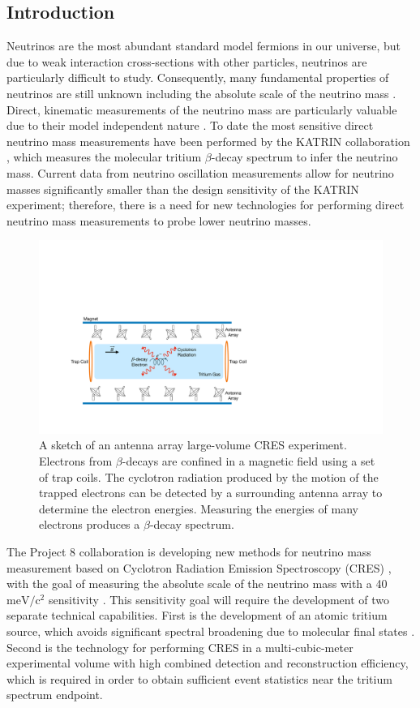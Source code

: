 \subsection{Introduction}
\label{sec:intro}

Neutrinos are the most abundant standard model fermions in our universe, but due to weak interaction cross-sections with other particles, neutrinos are particularly difficult to study. Consequently, many fundamental properties of neutrinos are still unknown including the absolute scale of the neutrino mass \cite{Workman:2022ynf}. Direct, kinematic measurements of the neutrino mass are particularly valuable due to their model independent nature \cite{FORMAGGIO20211}. To date the most sensitive direct neutrino mass measurements have been performed by the KATRIN collaboration \cite{Aker2022}, which measures the molecular tritium $\beta$-decay spectrum to infer the neutrino mass. Current data from neutrino oscillation measurements \cite{Workman:2022ynf} allow for neutrino masses significantly smaller than the design sensitivity of the KATRIN experiment; therefore, there is a need for new technologies for performing direct neutrino mass measurements to probe lower neutrino masses.

\begin{figure}[htbp]
\centering
\includegraphics[width=.6\textwidth]{figs/Chapter-5/220914_fscd_cartoon.pdf}
\qquad
\caption{\label{fig:fscd-cartoon} A sketch of an antenna array large-volume CRES experiment. Electrons from $\beta$-decays are confined in a magnetic field using a set of trap coils. The cyclotron radiation produced by the motion of the trapped electrons can be detected by a surrounding antenna array to determine the electron energies. Measuring the energies of many electrons produces a $\beta$-decay spectrum.}
\end{figure}

The Project 8 collaboration is developing new methods for neutrino mass measurement based on Cyclotron Radiation Emission Spectroscopy (CRES) \cite{Monreal:2009za, Project8:2014ivu, Project8:2017nal, Project8:2022wqh}, with the goal of measuring the absolute scale of the neutrino mass with a 40 $\textrm{meV}/\textrm{c}^2$ sensitivity \cite{PhysRevC.103.065501, FORMAGGIO20211}. This sensitivity goal will require the development of two separate technical capabilities. First is the development of an atomic tritium source, which avoids significant spectral broadening due to molecular final states \cite{Bodine:2015sma}. Second is the technology for performing CRES in a multi-cubic-meter experimental volume with high combined detection and reconstruction efficiency, which is required in order to obtain sufficient event statistics near the tritium spectrum endpoint.

